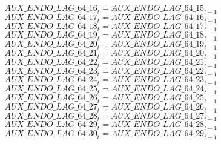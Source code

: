 \begin{dmath}
{AUX\_ENDO\_LAG\_64\_16}_{t}={AUX\_ENDO\_LAG\_64\_15}_{t-1}
\end{dmath}
\begin{dmath}
{AUX\_ENDO\_LAG\_64\_17}_{t}={AUX\_ENDO\_LAG\_64\_16}_{t-1}
\end{dmath}
\begin{dmath}
{AUX\_ENDO\_LAG\_64\_18}_{t}={AUX\_ENDO\_LAG\_64\_17}_{t-1}
\end{dmath}
\begin{dmath}
{AUX\_ENDO\_LAG\_64\_19}_{t}={AUX\_ENDO\_LAG\_64\_18}_{t-1}
\end{dmath}
\begin{dmath}
{AUX\_ENDO\_LAG\_64\_20}_{t}={AUX\_ENDO\_LAG\_64\_19}_{t-1}
\end{dmath}
\begin{dmath}
{AUX\_ENDO\_LAG\_64\_21}_{t}={AUX\_ENDO\_LAG\_64\_20}_{t-1}
\end{dmath}
\begin{dmath}
{AUX\_ENDO\_LAG\_64\_22}_{t}={AUX\_ENDO\_LAG\_64\_21}_{t-1}
\end{dmath}
\begin{dmath}
{AUX\_ENDO\_LAG\_64\_23}_{t}={AUX\_ENDO\_LAG\_64\_22}_{t-1}
\end{dmath}
\begin{dmath}
{AUX\_ENDO\_LAG\_64\_24}_{t}={AUX\_ENDO\_LAG\_64\_23}_{t-1}
\end{dmath}
\begin{dmath}
{AUX\_ENDO\_LAG\_64\_25}_{t}={AUX\_ENDO\_LAG\_64\_24}_{t-1}
\end{dmath}
\begin{dmath}
{AUX\_ENDO\_LAG\_64\_26}_{t}={AUX\_ENDO\_LAG\_64\_25}_{t-1}
\end{dmath}
\begin{dmath}
{AUX\_ENDO\_LAG\_64\_27}_{t}={AUX\_ENDO\_LAG\_64\_26}_{t-1}
\end{dmath}
\begin{dmath}
{AUX\_ENDO\_LAG\_64\_28}_{t}={AUX\_ENDO\_LAG\_64\_27}_{t-1}
\end{dmath}
\begin{dmath}
{AUX\_ENDO\_LAG\_64\_29}_{t}={AUX\_ENDO\_LAG\_64\_28}_{t-1}
\end{dmath}
\begin{dmath}
{AUX\_ENDO\_LAG\_64\_30}_{t}={AUX\_ENDO\_LAG\_64\_29}_{t-1}
\end{dmath}
